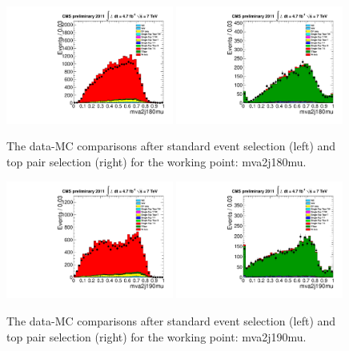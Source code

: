 \begin{figure}[!t]
  \centering
  \includegraphics[width=0.49\textwidth]{figs/cl-mva2j180mu-normal.pdf}
  \includegraphics[width=0.49\textwidth]{figs/cl-mva2j180mu-inTTbar.pdf}
  \caption{\label{fig:mva:plots-mva2j180mu} The data-MC comparisons
    after standard event selection (left) and top pair
    selection (right) for the working point: mva2j180mu.}
\end{figure}

\begin{figure}[!t]
  \centering
  \includegraphics[width=0.49\textwidth]{figs/cl-mva2j190mu-normal.pdf}
  \includegraphics[width=0.49\textwidth]{figs/cl-mva2j190mu-inTTbar.pdf}
  \caption{\label{fig:mva:plots-mva2j190mu} The data-MC comparisons
    after standard event selection (left) and top pair
    selection (right) for the working point: mva2j190mu.}
\end{figure}

